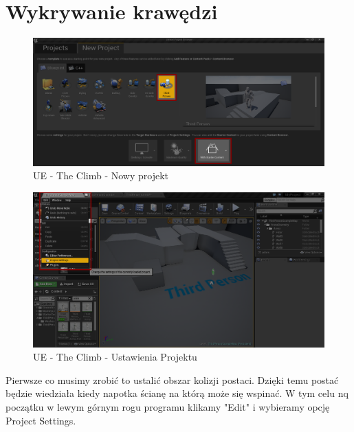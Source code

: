 \documentclass[brudnopis]{xmgr}
\begin{document}
\section{Wykrywanie krawędzi}

\begin{figure}[!htb]
    \begin{center}
    \includegraphics[scale=0.35]{Screeny/UE-Climb-NewProject.png}
    \end{center}
    \caption{UE - The Climb - Nowy projekt}
\end{figure}

\begin{figure}[!htb]
    \begin{center}
    \includegraphics[scale=0.35]{Screeny/UE-Climb-ProjectSettings.png}
    \end{center}
    \caption{UE - The Climb - Ustawienia Projektu}
\end{figure}

Pierwsze co musimy zrobić to ustalić obszar kolizji postaci. Dzięki temu postać będzie wiedziała kiedy napotka ścianę na którą może się wspinać. W tym celu nq początku w lewym górnym rogu programu klikamy "Edit" i wybieramy opcję Project Settings. 
\end{document}
